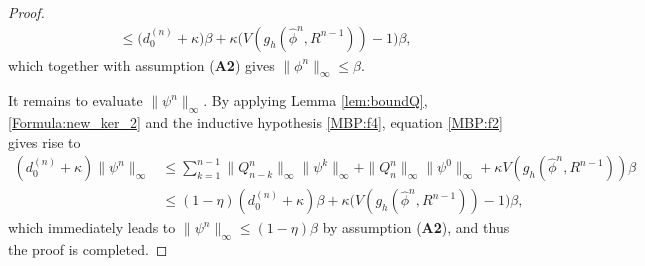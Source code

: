 \documentclass{m2an}
\begin{document}
\begin{proof}
\begin{equation}
\begin{aligned}
			& \le \big( d^{(n)}_{0} + \kappa  \big) \beta + \kappa \big( V( g_h(\hat{\phi}^{n}, R^{n-1}) ) - 1 \big) \beta,
		\end{aligned}
	\end{equation}
	which together with assumption (\textbf{A2}) gives $ \| \phi^n \|_{\infty} \leq \beta $. 
	
	It remains to evaluate $ \| \psi^{n} \|_{\infty} $. By applying Lemma \ref{lem:boundQ}, \eqref{Formula:new_ker_2} and the inductive hypothesis \eqref{MBP:f4}, equation \eqref{MBP:f2} gives rise to
	\begin{equation}\label{MBP:f6}
		\begin{aligned}
			( d^{(n)}_{0} + \kappa ) \| \psi^n \|_{\infty}  & \leq \sum^{n-1}_{k=1} \| Q^{n}_{n-k} \|_{\infty} \| \psi^{k} \|_{\infty} + \| Q^{n}_{n} \|_{\infty} \| \psi^{0} \|_{\infty} +\kappa V( g_h(\hat{\phi}^{n}, R^{n-1}) ) \beta \\
			& \le (1 - \eta) ( d^{(n)}_{0} + \kappa ) \beta + \kappa \big( V( g_h(\hat{\phi}^{n}, R^{n-1}) ) - 1 \big) \beta,
		\end{aligned}
	\end{equation}
	which immediately leads to $ \| \psi^n \|_{\infty} \leq ( 1 - \eta ) \beta $ by assumption (\textbf{A2}), and thus the proof is completed.
\end{proof}
\end{document}
